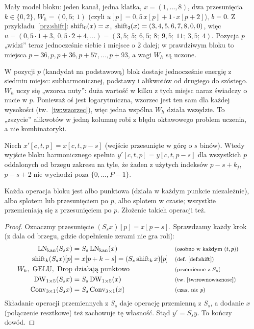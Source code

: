 \begin{naliczbach}
Mały model bloku: jeden kanał, jedna klatka, $x=(1,\dots,8)$, dwa przesunięcia $k\in\{0,2\}$, $W_h=(0{,}5;\ 1)$ (czyli $u[p]=0{,}5\,x[p]+1\cdot x[p+2]$), $b=0$.
Z przykładu~\ref{prz:shift}: $\operatorname{shift}_0(x)=x$, $\operatorname{shift}_2(x)=(3,4,5,6,7,8,0,0)$, więc
$u=(0{,}5\cdot1+3,\ 0{,}5\cdot2+4,\dots)=(3{,}5;\ 5;\ 6{,}5;\ 8;\ 9{,}5;\ 11;\ 3{,}5;\ 4)$.
Pozycja $p$ „widzi” teraz jednocześnie siebie i miejsce o $2$ dalej; w prawdziwym bloku to miejsca $p-36,p,p+36,p+57,\dots,p+93$, a wagi $W_h$ są uczone.
\end{naliczbach}

\begin{intuicja}
W pozycji $p$ (kandydat na podstawową) blok dostaje jednocześnie energię z siedmiu miejsc: subharmonicznej, podstawy i alikwotów od drugiego do szóstego. $W_h$ uczy się „wzorca nuty”: duża wartość w kilku z tych miejsc naraz świadczy o nucie w $p$.
Ponieważ oś jest logarytmiczna, wzorzec jest ten sam dla każdej wysokości (tw.~\ref{tw:wzorzec}), więc jedna wspólna $W_h$ działa wszędzie. To „zszycie” alikwotów w jedną kolumnę robi z błędu oktawowego problem uczenia, a nie kombinatoryki.
\end{intuicja}

\begin{twierdzenie}\label{tw:rownowaznosc-wysokosci}
Niech $x'[c,t,p]=x[c,t,p-s]$ (wejście przesunięte w górę o $s$ binów). Wtedy wyjście bloku harmonicznego spełnia $y'[c,t,p]=y[c,t,p-s]$ dla wszystkich $p$ oddalonych od brzegu zakresu na tyle, że żaden z użytych indeksów $p-s+k_j$, $p-s\pm2$ nie wychodzi poza $\{0,\dots,P-1\}$.
\end{twierdzenie}
\begin{pomyslDowodu}
Każda operacja bloku jest albo punktowa (działa w każdym punkcie niezależnie), albo splotem lub przesunięciem po $p$, albo splotem w czasie; wszystkie przemieniają się z przesunięciem po $p$. Złożenie takich operacji też.
\end{pomyslDowodu}
\begin{proof}
Oznaczmy przesunięcie $(S_sx)[p]=x[p-s]$. Sprawdzamy każdy krok (z dala od brzegu, gdzie dopełnienie zerami nie gra roli):
\begin{align*}
\operatorname{LN}_\mathrm{kan}(S_sx) &= S_s\operatorname{LN}_\mathrm{kan}(x) && \text{\footnotesize (osobno w każdym $(t,p)$)}\\
\operatorname{shift}_k(S_sx)[p] &= x[p+k-s]=(S_s\operatorname{shift}_kx)[p] && \text{\footnotesize (def.~\ref{def:shift})}\\
W_h,\ \operatorname{GELU},\ \operatorname{Drop} &\ \text{działają punktowo} && \text{\footnotesize (przemienne z $S_s$)}\\
\operatorname{DW}_{1\times5}(S_sx) &= S_s\operatorname{DW}_{1\times5}(x) && \text{\footnotesize (tw.~\ref{tw:rownowaznosc})}\\
\operatorname{Conv}_{3\times1}(S_sx) &= S_s\operatorname{Conv}_{3\times1}(x) && \text{\footnotesize (czas, nie $p$)}
\end{align*}
Składanie operacji przemiennych z $S_s$ daje operację przemienną z $S_s$, a dodanie $x$ (połączenie resztkowe) też zachowuje tę własność. Stąd $y'=S_sy$. To kończy dowód.
\end{proof}

